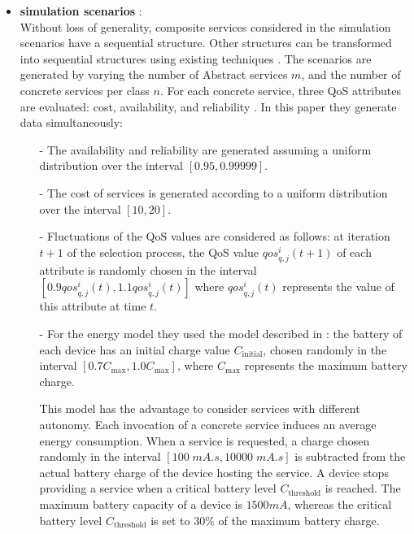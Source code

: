 \documentclass{sigchi}
\begin{document}
\begin{itemize}
\item \textbf{simulation scenarios\cite{DBLP:journals/tase/KhanoucheACKY16} } :\\
 Without loss of generality, composite services considered in the simulation scenarios have a sequential structure. Other structures can be transformed into sequential structures using existing techniques \cite{journals/ws/CardosoSMAK04}. The scenarios are generated by varying the number of Abstract services $m$, and the number of concrete services per class $n$. For each concrete service, three QoS attributes are evaluated: cost, availability, and reliability \cite{DBLP:journals/tase/KhanoucheACKY16}. In this paper they generate data simultaneously:
\begin{itemize}
\item[-] The availability and reliability are generated assuming a uniform distribution over the interval $[0.95, 0.99999]$.
\item[-] The cost of services is generated according to a uniform distribution over the interval $[10, 20]$.
\item[-] Fluctuations of the QoS values are considered as follows: at iteration $t+1$ of the selection process, the QoS value $qos_{q,j}^i (t+1)$ of each attribute is randomly chosen in the interval $[0.9 qos_{q,j}^i(t), 1.1 qos_{q,j}^i(t)]$ where $qos_{q,j}^i(t)$ represents the value of this attribute at time $t$.
\item[-]For the energy model they used the model described in \cite{Flinn:1999:EAM:319344.319155}: the battery of each device has an initial charge value $C_{\text{initial}}$, chosen randomly in the interval $[0.7 C_{\text{max}}, 1.0 C_{\text{max}}]$, where $C_{\text{max}}$ represents the maximum battery charge. 

This model has the advantage to consider services with different autonomy. Each invocation of a concrete service induces an average energy consumption. When a service is requested, a charge chosen randomly in the interval $[100 \; mA.s, 10000 \; mA.s]$ is subtracted from the actual battery charge of the device hosting the service. A device stops providing a service when a critical battery level $C_{\text{threshold}}$ is reached. The maximum battery capacity of a device is $1500 mA$, whereas the critical battery level $C_{\text{threshold}}$ is set to $30\%$ of the maximum battery charge.

\end{itemize}


\end{itemize}
\end{document}
